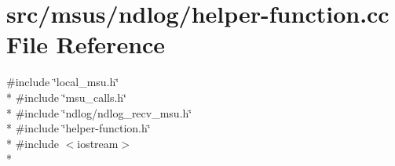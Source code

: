 \hypertarget{helper-function_8cc}{\section{src/msus/ndlog/helper-\/function.cc File Reference}
\label{helper-function_8cc}
}
{\ttfamily \#include \char`\"{}local\-\_\-msu.\-h\char`\"{}}\\*
{\ttfamily \#include \char`\"{}msu\-\_\-calls.\-h\char`\"{}}\\*
{\ttfamily \#include \char`\"{}ndlog/ndlog\-\_\-recv\-\_\-msu.\-h\char`\"{}}\\*
{\ttfamily \#include \char`\"{}helper-\/function.\-h\char`\"{}}\\*
{\ttfamily \#include $<$iostream$>$}\\*

